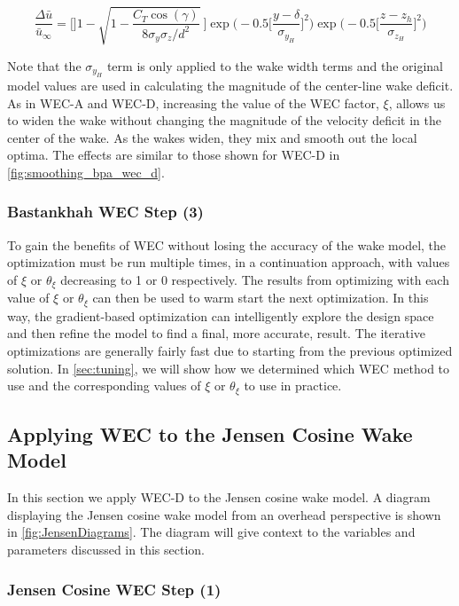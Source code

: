 \documentclass{jpconf}
\begin{document}
\begin{equation}
	\frac{\Delta \bar{u}}{\bar{u}_{\infty}} = \Bigg[]1-\sqrt{1-\frac{C_T \cos{(\gamma)}}{8 \sigma_y \sigma_z/d^2}}~\Bigg] \exp{\bigg(-0.5\Big[\frac{y-\delta}{ \sigma_{y_H}}\Big]^2\bigg)}\exp{\bigg(-0.5\Big[\frac{z-z_h}{ \sigma_{z_H}}\Big]^2\bigg)}
	\label{eq:wechapplied}
\end{equation}

Note that the $\sigma_{y_H}$ term is only applied to the wake width terms and the original model values are used in calculating the magnitude of the center-line wake deficit. As in WEC-A and WEC-D, increasing the value of the WEC factor, $\xi$, allows us to widen the wake without changing the magnitude of the velocity deficit in the center of the wake. As the wakes widen, they mix and smooth out the local optima. The effects are similar to those shown for WEC-D in \cref{fig:smoothing_bpa_wec_d}.

\subsubsection{Bastankhah WEC Step (3)}
To gain the benefits of WEC without losing the accuracy of the wake model, the optimization must be run multiple times, in a continuation approach, with values of $\xi$ or $\theta_\xi$ decreasing to 1 or 0 respectively. The results from optimizing with each value of $\xi$ or $\theta_\xi$ can then be used to warm start the next optimization. In this way, the gradient-based optimization can intelligently explore the design space and then refine the model to find a final, more accurate, result. The iterative optimizations are generally fairly fast due to starting from the previous optimized solution. In \cref{sec:tuning}, we will show how we determined which WEC method to use and the corresponding values of $\xi$ or $\theta_\xi$ to use in practice.

\subsection{Applying WEC to the Jensen Cosine Wake Model}
In this section we apply WEC-D to the Jensen cosine wake model. A diagram displaying the Jensen cosine wake model from an overhead perspective is shown in \cref{fig:JensenDiagrams}. The diagram will give context to the variables and parameters discussed in this section.

\subsubsection{Jensen Cosine WEC Step (1)} 
\end{document}
